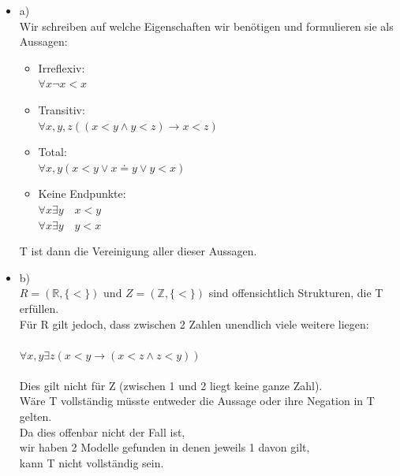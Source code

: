 \documentclass[a4paper]{scrartcl}
\begin{document}
    \begin{itemize}
        \item a)\\
            Wir schreiben auf welche Eigenschaften wir benötigen und formulieren sie als Aussagen:\\
            \begin{itemize}
                \item Irreflexiv:\\
                    $\forall x \neg x < x$\\
                \item Transitiv:\\
                    $\forall x,y,z ((x < y \land y < z) \rightarrow x < z)$\\
                \item Total:\\
                    $\forall x,y (x < y \lor x \doteq y \lor y < x)$\\
                \item Keine Endpunkte:\\
                    $\forall x \exists y \quad x < y$\\
                    $\forall x \exists y \quad y < x$\\
            \end{itemize}
            T ist dann die Vereinigung aller dieser Aussagen.\\
        \item b)\\
            $R = (\mathds{R}, \{<\}) \text{ und } Z = (\mathds{Z}, \{<\})$ sind offensichtlich Strukturen, die T erfüllen.\\
            Für R gilt jedoch, dass zwischen 2 Zahlen unendlich viele weitere liegen:\\
            \\$\forall x,y \exists z (x < y \rightarrow (x < z \land z < y))$\\
            \\Dies gilt nicht für Z (zwischen 1 und 2 liegt keine ganze Zahl).\\
            Wäre T vollständig müsste entweder die Aussage oder ihre Negation in T gelten.\\
            Da dies offenbar nicht der Fall ist,\\
            wir haben 2 Modelle gefunden in denen jeweils 1 davon gilt,\\
            kann T nicht vollständig sein.\\
    \end{itemize}%
\end{document}
